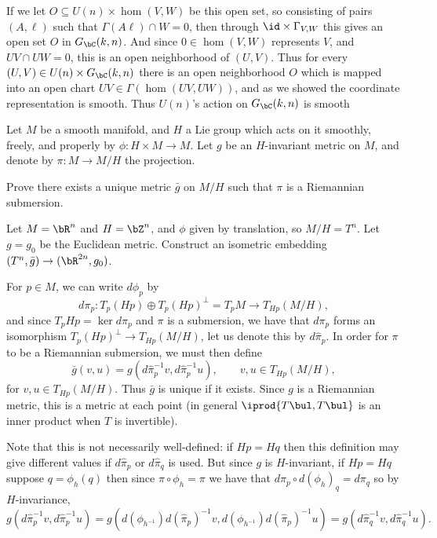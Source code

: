     If we let $O\subseteq U(n)\times\hom(V,W)$ be this open set, so consisting of pairs $(A,\ell)$ such that $\Gamma(A\ell)\cap W=0$, then through $\id\times\Gamma_{V,W}$ this gives an open
    set $O$ in $G_\bC(k,n)$.
    And since $0\in\hom(V,W)$ represents $V$, and $UV\cap UW=0$, this is an open neighborhood of $(U,V)$.
    Thus for every $(U,V)\in U(n)\times G_\bC(k,n)$ there is an open neighborhood $O$ which is mapped into an open chart $UV\in\Gamma(\hom(UV,UW))$, and as we showed the coordinate
    representation is smooth.
    Thus $U(n)$'s action on $G_\bC(k,n)$ is smooth
\eenum

\bprob

    Let $M$ be a smooth manifold, and $H$ a Lie group which acts on it smoothly, freely, and properly by $\phi\colon H\times M\to M$.
    Let $g$ be an $H$-invariant metric on $M$, and denote by $\pi\colon M\to M/H$ the projection.
    \benum
        \item Prove there exists a unique metric $\bar g$ on $M/H$ such that $\pi$ is a Riemannian submersion.
        \item Let $M=\bR^n$ and $H=\bZ^n$, and $\phi$ given by translation, so $M/H=T^n$.
        Let $g=g_0$ be the Euclidean metric.
        Construct an isometric embedding $(T^n,\bar g)\to(\bR^{2n},g_0)$.
    \eenum

\eprob

\benum
    \item For $p\in M$, we can write $d\phi_p$ by
    $$ d\pi_p\colon T_p(Hp)\oplus T_p(Hp)^\perp = T_pM \to T_{Hp}(M/H) , $$
    and since $T_pHp=\ker d\pi_p$ and $\pi$ is a submersion, we have that $d\pi_p$ forms an isomorphism $T_p(Hp)^\perp\to T_{Hp}(M/H)$, let us denote this by $d\hat\pi_p$.
    In order for $\pi$ to be a Riemannian submersion, we must then define
    $$ \bar g(v,u) = g(d\hat\pi_p^{-1}v,d\hat\pi_p^{-1}u),\qquad v,u\in T_{Hp}(M/H), $$
    for $v,u\in T_{Hp}(M/H)$.
    Thus $\bar g$ is unique if it exists.
    Since $g$ is a Riemannian metric, this is a metric at each point (in general $\iprod{T\bul,T\bul}$ is an inner product when $T$ is invertible).

    Note that this is not necessarily well-defined: if $Hp=Hq$ then this definition may give different values if $d\hat\pi_p$ or $d\hat\pi_q$ is used.
    But since $g$ is $H$-invariant, if $Hp=Hq$ suppose $q=\phi_h(q)$ then since $\pi\circ\phi_h=\pi$ we have that $d\pi_{p}\circ d(\phi_h)_q=d\pi_q$ so by $H$-invariance,
    $$ g(d\hat\pi_p^{-1}v,d\hat\pi_p^{-1}u) = g(d(\phi_{h^{-1}})d(\hat\pi_p)^{-1}v,d(\phi_{h^{-1}})d(\hat\pi_p)^{-1}u) = g(d\hat\pi_q^{-1}v,d\hat\pi_q^{-1}u) . $$

